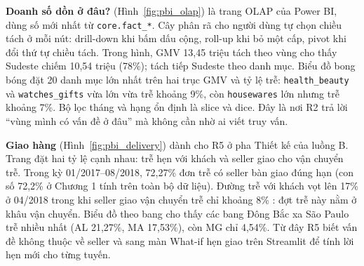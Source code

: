 
\textbf{Doanh số dồn ở đâu?} (Hình~\ref{fig:pbi_olap}) là trang OLAP của Power BI, dùng số mới nhất từ \texttt{core.fact\_*}. Cây phân rã  cho người dùng tự chọn chiều tách ở mỗi nút: drill-down khi bấm dấu cộng, roll-up khi bỏ một cấp, pivot khi đổi thứ tự chiều tách. Trong hình, GMV 13,45 triệu tách theo vùng cho thấy Sudeste chiếm 10,54 triệu (78\%); tách tiếp Sudeste theo danh mục. Biểu đồ bong bóng  đặt 20 danh mục lớn nhất trên hai trục GMV và tỷ lệ trễ: \texttt{health\_beauty} và \texttt{watches\_gifts} vừa lớn vừa trễ khoảng 9\%, còn \texttt{housewares} lớn nhưng trễ khoảng 7\%. Bộ lọc tháng và hạng ổn định  là slice và dice. Đây là nơi R2 trả lời ``vùng mình có vấn đề ở đâu'' mà không cần nhờ ai viết truy vấn.


\textbf{Giao hàng} (Hình~\ref{fig:pbi_delivery}) dành cho R5 ở pha Thiết kế của luồng B. Trang đặt hai tỷ lệ cạnh nhau: trễ hẹn với khách và seller giao cho vận chuyển trễ. Trong kỳ 01/2017--08/2018, 72,27\% đơn trễ có seller bàn giao đúng hạn  (con số 72,2\% ở Chương 1 tính trên toàn bộ dữ liệu). Đường trễ với khách vọt lên 17\% ở 04/2018 trong khi seller giao vận chuyển trễ chỉ khoảng 8\% : đợt trễ này nằm ở khâu vận chuyển. Biểu đồ theo bang  cho thấy các bang Đông Bắc xa São Paulo trễ nhiều nhất (AL 21,27\%, MA 17,53\%), còn MG chỉ 4,54\%. Từ đây R5 biết vấn đề không thuộc về seller và sang màn What-if hẹn giao trên Streamlit để tính lời hẹn mới cho từng tuyến.


